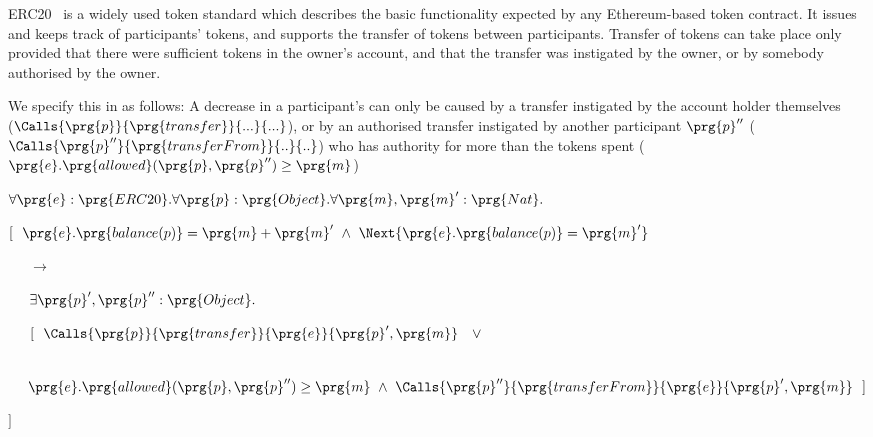  
 ERC20~\cite{ERC20} is a widely used token standard which describes the 
 basic functionality expected by any    Ethereum-based token contract. 
 It issues and keeps track of participants' tokens, and supports the  transfer
 of tokens between participants. 
%
%
Transfer of tokens 
 can   take place only provided that  there were sufficient tokens in the
 owner's account, and that
 the transfer was instigated by the owner, or by somebody authorised
 by the owner.

We specify this in \Chainmail as follows:
A decrease in  a participant's  
can only be caused by a transfer instigated by the 
account holder themselves\\ (\ie $\Calls {\prg{p}} {\prg{transfer}} {...} {...}$), or by
an authorised transfer instigated by another participant $\prg{p}''$  (\ie $\Calls {\prg{p}''} {{\prg{transferFrom}} } {..} {..}$) who 
has authority for more than the tokens spent (\ie  $\prg{e}.\prg{allowed}(\prg{p},\prg{p}'')\geq \prg{m}$)
 
\vspace{.15cm}
\noindent
$\forall \prg{e}:\prg{ERC20}.\forall \prg{p}:\prg{Object}.\forall \prg{m},\prg{m}':\prg{Nat}.$\\
\strut \hspace{0.3cm} $[\ \ \prg{e}.\prg{balance(p)}=\prg{m}+\prg{m}^\prime\ \wedge \ \Next{\prg{e}.\prg{balance(p)}=\prg{m}'}$ \\ %
\strut \hspace{0.4cm} \ \ \ $\longrightarrow$\\
\strut \hspace{0.4cm} \ \ \ $\exists \prg{p}',\prg{p}'':\prg{Object}.$ \\
\strut \hspace{0.4cm} \ \ \  $[\ \  \Calls{\prg{p}} {\prg{transfer}}  {\prg{e}}  {\prg{p}',\prg{m}} \  \  \ \vee\, $\\
\strut \hspace{0.4cm} \ \ \   $\ \ \ \ \prg{e}.\prg{allowed}(\prg{p},\prg{p}'')\geq \prg{m} \ \wedge \ \Calls{\prg{p}''} {\prg{transferFrom}}  {\prg{e}}  {\prg{p}',\prg{m}}\       \  ]$\\
\strut \hspace{0.3cm} $] $
\vspace{.15cm}


